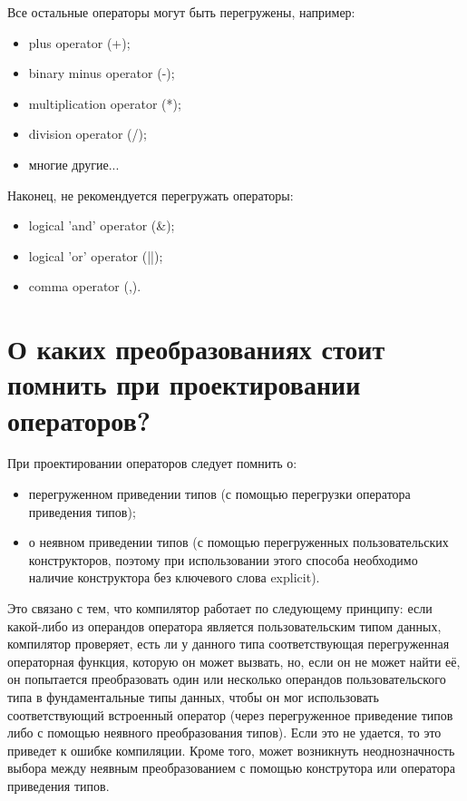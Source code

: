 \documentclass[a4paper,12pt]{article}	%
\begin{document}
	Все остальные операторы могут быть перегружены, например:
	
	\begin{itemize}
	
	\item plus operator (+);
	\item binary minus operator (-);
	\item multiplication operator (*);
	\item division operator (/);
	\item многие другие...
	
	\end{itemize}

	Наконец, не рекомендуется перегружать операторы:
	
	\begin{itemize}
	
	\item logical 'and' operator (\&);
	
	\item logical 'or' operator (||);
	
	\item comma operator (,).
	
	\end{itemize}
	
\newpage

\section{О каких преобразованиях стоит помнить при проектировании операторов?}
	
	При проектировании операторов следует помнить о:
		
	\begin{itemize}
	
	\item перегруженном приведении типов (с помощью перегрузки оператора приведения типов); 
	
	\item о неявном приведении типов (с помощью перегруженных пользовательских конструкторов, поэтому при использовании этого способа необходимо наличие конструктора без ключевого слова explicit).
	
	\end{itemize}

	Это связано с тем, что компилятор работает по следующему принципу: если какой-либо из операндов оператора является пользовательским типом данных, компилятор проверяет, есть ли у данного типа соответствующая перегруженная операторная функция, которую он может вызвать, но, если он не может найти её, он попытается преобразовать один или несколько операндов пользовательского типа в фундаментальные типы данных, чтобы он мог использовать соответствующий встроенный оператор (через перегруженное приведение типов либо с помощью неявного преобразования типов). Если это не удается, то это приведет к ошибке компиляции. Кроме того, может возникнуть неоднозначность выбора между неявным преобразованием с помощью конструтора или оператора приведения типов.
\end{document}
